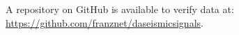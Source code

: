 \documentclass[journal]{IEEEtran}
\begin{document}
A repository on GitHub is available to verify data at: \href{https://github.com/franznet/daseismicsignals}{\color{blue}https://github.com/franznet/daseismicsignals}.



%







\ifCLASSOPTIONcaptionsoff
  \newpage
\fi
\end{document}
